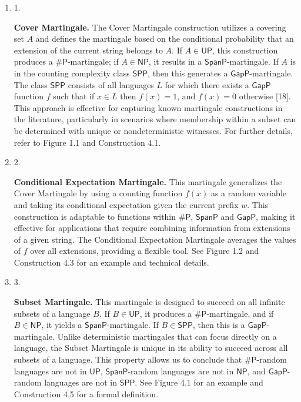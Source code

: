 \begin{enumerate}


\item[] 
1. 


\textbf{Cover Martingale.} The Cover Martingale construction utilizes a covering set $A$ and defines the martingale based on the conditional probability that an extension of the current string belongs to $A$. If $A\in\mathsf{UP}$, this construction produces a ${\mathsf{\#}\mathsf{P}}$-martingale; if $A\in\mathsf{NP}$, it results in a $\mathsf{SpanP}$-martingale. If $A$ is in the counting complexity class $\mathsf{SPP}$, then this generates a $\mathsf{GapP}$-martingale. The class $\mathsf{SPP}$ consists of all languages $L$ for which there exists a $\mathsf{GapP}$ function $f$ such that if $x\in L$ then $f(x)=1$, and $f(x)=0$ otherwise [18]. This approach is effective for capturing known martingale constructions in the literature, particularly in scenarios where membership within a subset can be determined with unique or nondeterministic witnesses. For further details, refer to Figure 1.1 and Construction 4.1.\par





\item[] 
2. 


\textbf{Conditional Expectation Martingale.} This martingale generalizes the Cover Martingale by using a counting function $f(x)$ as a random variable and taking its conditional expectation given the current prefix $w$. This construction is adaptable to functions within ${\mathsf{\#}\mathsf{P}}$, $\mathsf{SpanP}$ and $\mathsf{GapP}$, making it effective for applications that require combining information from extensions of a given string. The Conditional Expectation Martingale averages the values of $f$ over all extensions, providing a flexible tool. See Figure 1.2 and Construction 4.3 for an example and technical details.\par





\item[] 
3. 


\textbf{Subset Martingale.} This martingale is designed to succeed on all infinite subsets of a language $B$. If $B\in\mathsf{UP}$, it produces a ${\mathsf{\#}\mathsf{P}}$-martingale, and if $B\in\mathsf{NP}$, it yields a $\mathsf{SpanP}$-martingale. If $B\in\mathsf{SPP}$, then this is a $\mathsf{GapP}$-martingale. Unlike deterministic martingales that can focus directly on a language, the Subset Martingale is unique in its ability to succeed across all subsets of a language. This property allows us to conclude that ${\mathsf{\#}\mathsf{P}}$-random languages are not in $\mathsf{UP}$, $\mathsf{SpanP}$-random languages are not in $\mathsf{NP}$, and $\mathsf{GapP}$-random languages are not in $\mathsf{SPP}$. See Figure 4.1 for an example and Construction 4.5 for a formal definition.\par






\end{enumerate}
